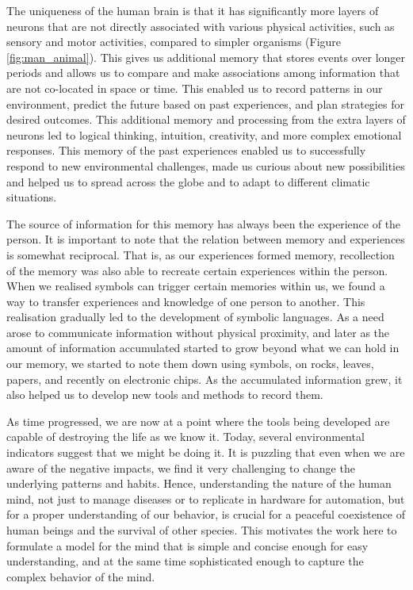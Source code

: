 \documentclass[reprint,amsmath,amssymb,apr,aip,onecolumn, 11pt]{revtex4-1}
\begin{document}
	The uniqueness of the human brain is that it has significantly more layers of neurons that are not directly associated with various physical activities, such as sensory and motor activities, compared to simpler organisms\cite{2014_Hofman, 2011_DeFelipe} (Figure \ref{fig:man_animal}). This gives us additional memory that stores events over longer periods and allows us to compare and make associations among information that are not co-located in space or time. This enabled us to record patterns in our environment, predict the future based on past experiences, and plan strategies for desired outcomes. This additional memory and processing from the extra layers of neurons led to logical thinking, intuition, creativity, and more complex emotional responses. This memory of the past experiences enabled us to successfully respond to new environmental challenges, made us curious about new possibilities and helped us to spread across the globe and to adapt to different climatic situations. 
	
	
	
	The source of information for this memory has always been the experience of the person. It is important to note that the relation between memory and experiences is somewhat reciprocal\cite{Canli_2000, Tyng_2017}. That is, as our experiences formed memory, recollection of the memory was also able to recreate certain experiences within the person.  When we realised symbols can trigger certain memories within us, we found a way to transfer experiences and knowledge of one person to another. This realisation gradually led to the development of symbolic languages. As a need arose to communicate information without physical proximity, and later as the amount of information accumulated started to grow beyond what we can hold in our memory, we started to note them down using symbols, on rocks, leaves, papers, and recently on electronic chips. As the accumulated information grew, it also helped us to develop new tools and methods to record them.
	
	As time progressed, we are now at a point where the tools being developed are capable of destroying the life as we know it. Today, several environmental indicators suggest that we might be doing it. It is puzzling that even when we are aware of the negative impacts, we find it very challenging to change the underlying patterns and habits. Hence, understanding the nature of the human mind, not just to manage diseases or to replicate in hardware for automation, but for a proper understanding of our behavior, is crucial for a peaceful coexistence of human beings and the survival of other species. This motivates the work here to formulate a model for the mind that is simple and concise enough for easy understanding, and at the same time sophisticated enough to capture the complex behavior of the mind. 
	
\end{document}
